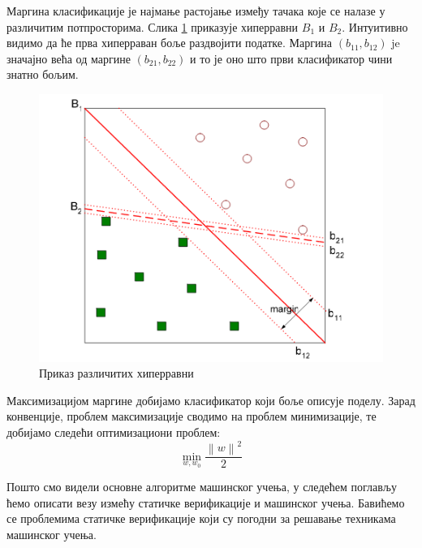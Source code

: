 \documentclass[a4paper]{article}
\newcommand{\norm}[1]{\left\lVert#1\right\rVert}
\begin{document}
{Маргина класификације је најмање растојање између тачака које се налазе у различитим потпросторима. Слика \ref{fig:svm} приказује хиперравни $B_1$ и $B_2$. Интуитивно видимо да ће прва хиперраван боље раздвојити податке. Маргина $(b_11, b_12)$ je значајно већа од маргине $(b_{21}, b_{22})$ и то је оно што први класификатор чини знатно бољим.

\begin{figure}[h!]
\begin{center}
\includegraphics[scale=0.6]{svn.png}
\end{center}
\caption{Приказ различитих хиперравни}
\label{fig:svm}
\end{figure}


Максимизацијом маргине добијамо класификатор који боље описује поделу. Зарад конвенције, проблем максимизације сводимо на проблем минимизације, те добијамо следећи оптимизациони проблем:
\begin{equation}
    \min_{w, w_0} \frac{ {\norm{w}}^2 }{2}
\end{equation}


Пошто смо видели основне алгоритме машинског учења, у следећем поглављу ћемо описати везу измећу статичке верификације и машинског учења. Бавићемо се проблемима статичке верификације који су погодни за решавање техникама машинског учења.


}
\end{document}
